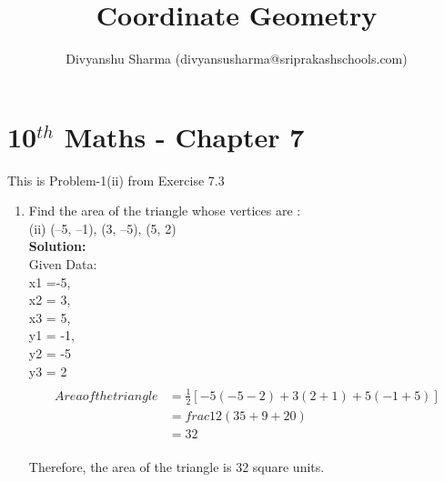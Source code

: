 \documentclass[12pt]{article}
\title{Coordinate Geometry}
\author{Divyanshu Sharma (divyansusharma@sriprakashschools.com)}
\newcommand{\solution}{\noindent \textbf{Solution: }}
\begin{document}
\maketitle
\section*{10$^{th}$ Maths - Chapter 7}
This is Problem-1(ii) from Exercise 7.3
\begin{enumerate}
\item Find the area of the triangle whose vertices are : 
\\ (ii) (–5, –1), (3, –5), (5, 2)
\\\solution \\ 
Given Data: 
\\x1 =-5, 
\\x2 = 3, 
\\x3 = 5, 
\\y1 = -1, 
\\y2 = -5 
\\y3 = 2
\begin{align}
\\Area of the triangle &=\frac{1}{2} [-5 { (-5-2)} + 3(2+1) + 5{(-1+5)}]
\\ &=frac{1}{2}{(35 + 9 + 20)} \\ &= 32
\end{align}
\\Therefore, the area of the triangle is 32 square units.


\end{enumerate}
\end{document}
